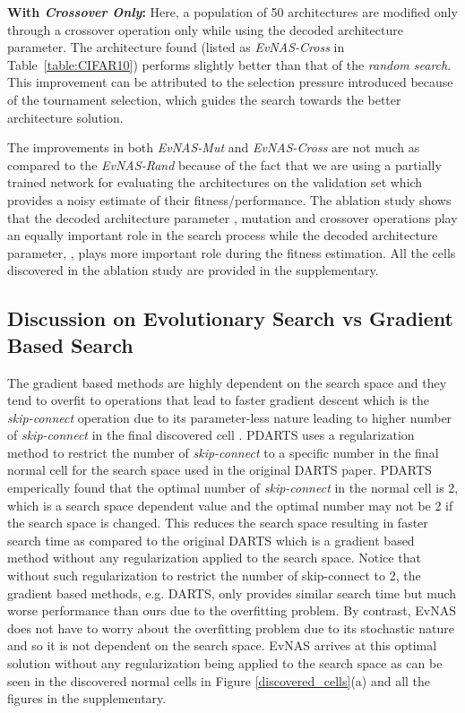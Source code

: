 \documentclass[final]{cvpr}
\begin{document}
\textbf{With \textit{Crossover Only}:} Here, a population of 50 architectures are
modified only through a crossover operation only while using the decoded architecture parameter.
The architecture found (listed as \textit{EvNAS-Cross} in Table~\ref{table:CIFAR10})
performs slightly better than that of the \textit{random search}. This improvement can be attributed
to the selection pressure \cite{eiben2003introduction} introduced because of the tournament
selection, which guides the search towards the better architecture solution. 

The improvements in both \textit{EvNAS-Mut} and \textit{EvNAS-Cross} are not much as compared to
the \textit{EvNAS-Rand} because of the fact that we are using a partially trained network for
evaluating the architectures on the validation set which provides a noisy estimate of their
fitness/performance. The ablation study shows that the decoded architecture parameter
, mutation and crossover operations play an equally important role in the search process while the decoded
architecture parameter, , plays more important role during the fitness estimation.
All the cells discovered in the ablation study are provided in the supplementary.

\subsection{Discussion on Evolutionary Search vs Gradient Based Search}
The gradient based methods are highly dependent on the search space and they tend to overfit to
operations that lead to faster gradient descent which is the \textit{skip-connect} operation due
to its parameter-less nature leading to higher number of \textit{skip-connect} in the final
discovered cell \cite{Zela2020Understanding}. PDARTS \cite{chen2019progressive} uses a
regularization method to restrict the number of \textit{skip-connect} to a specific number in the
final normal cell for the search space used in the original DARTS paper. PDARTS emperically found
that the optimal number of \textit{skip-connect} in the normal cell is 2, which is a search space
dependent value and the optimal number may not be 2 if the search space is changed. This reduces the
search space resulting in faster search time as compared to the original DARTS which is a gradient
based method without any regularization applied to the search space. Notice that without  such
regularization to restrict the number of skip-connect to 2, the gradient based methods, e.g. DARTS,
only provides similar search time but much worse performance than ours due to the overfitting problem.
By contrast, EvNAS does not have to worry about the overfitting problem due to its stochastic nature
and so it is not dependent on the search space. EvNAS arrives at this optimal solution without any
regularization being applied to the search space as can be seen in the discovered normal cells in
Figure \ref{discovered_cells}(a) and all the figures in the supplementary.
\end{document}
